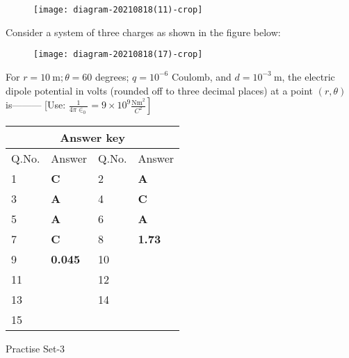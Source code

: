 \begin{enumerate}[label=\color{ocre}\textbf{\arabic*.}]
\begin{figure}[H]
	\centering
	\texttt{[image: diagram-20210818(11)-crop]}
\end{figure}
	\question Consider a system of three charges as shown in the figure below:\\
\begin{figure}[H]
	\centering
	\texttt{[image: diagram-20210818(17)-crop]}
\end{figure}
For $r=10 \mathrm{~m} ; \theta=60$ degrees; $q=10^{-6}$ Coulomb, and $d=10^{-3} \mathrm{~m}$, the electric dipole potential in volts (rounded off to three decimal places) at a point $(r, \theta)$ is--------- [Use: $\left.\frac{1}{4 \pi \in_{0}}=9 \times 10^{9} \frac{\mathrm{Nm}^{2}}{C^{2}}\right]$
{}
\end{enumerate}
\setlength\arrayrulewidth{1pt}
\begin{table}[H]
	\centering
	\begin{tabular}{|p{1.5cm}|p{1.5cm}||p{1.5cm}|p{1.5cm}|}
		\hline
		\multicolumn{4}{|c|}{\textbf{Answer key}}\\\hline\hline
		\rowcolor{ocrel}Q.No.&Answer&Q.No.&Answer\\\hline
		1&\textbf{C} &2&\textbf{A}\\\hline 
		3&\textbf{A} &4&\textbf{C} \\\hline
		5&\textbf{A} &6&\textbf{A} \\\hline
		7&\textbf{C}&8&\textbf{1.73}\\\hline
		9&\textbf{0.045}&10&\textbf{}\\\hline
		11&\textbf{} &12&\textbf{}\\\hline
		13&\textbf{}&14&\textbf{}\\\hline
		15&\textbf{}& &\\\hline
		
	\end{tabular}
\end{table}
\newpage 
\begin{abox}
	Practise Set-3
\end{abox}
